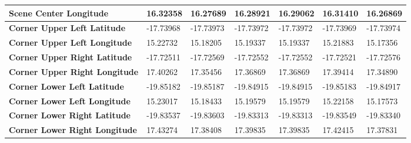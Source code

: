 \documentclass[climate,article,submit,pdftex,moreauthors]{Definitions/mdpi}
\begin{document}
\begin{table}
{\begin{tabular}{|l|l|l|l|l|l|l|}
        \textbf{Scene Center Longitude} & 16.32358 & 16.27689 & 16.28921 & 16.29062 & 16.31410 & 16.26869 \\ \hline
        \textbf{Corner Upper Left Latitude} & -17.73968 & -17.73973 & -17.73972 & -17.73972 & -17.73969 & -17.73974 \\ \hline
        \textbf{Corner Upper Left Longitude} & 15.22732 & 15.18205 & 15.19337 & 15.19337 & 15.21883 & 15.17356 \\ \hline
        \textbf{Corner Upper Right Latitude} & -17.72511 & -17.72569 & -17.72552 & -17.72552 & -17.72521 & -17.72576 \\ \hline
        \textbf{Corner Upper Right Longitude} & 17.40262 & 17.35456 & 17.36869 & 17.36869 & 17.39414 & 17.34890 \\ \hline
        \textbf{Corner Lower Left Latitude} & -19.85182 & -19.85187 & -19.84915 & -19.84915 & -19.85183 & -19.84917 \\ \hline
        \textbf{Corner Lower Left Longitude} & 15.23017 & 15.18433 & 15.19579 & 15.19579 & 15.22158 & 15.17573 \\ \hline
        \textbf{Corner Lower Right Latitude} & -19.83537 & -19.83603 & -19.83313 & -19.83313 & -19.83549 & -19.83340 \\ \hline
        \textbf{Corner Lower Right Longitude} & 17.43274 & 17.38408 & 17.39835 & 17.39835 & 17.42415 & 17.37831 \\ \hline
    \end{tabular}%
    }
  \end{table}
\end{document}
